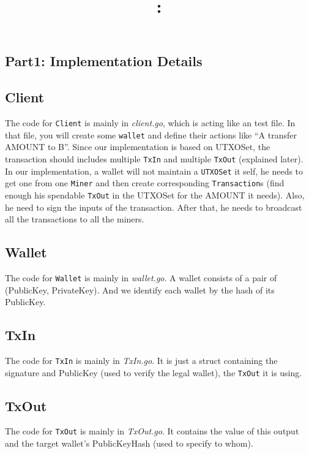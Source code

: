 \documentclass{article}
\title{\textmd{\bf \Class: \Title}\\ \normalsize\vspace{0.1in}}
\date{}
\begin{document}
	\begin{spacing}{1.0}
		\maketitle \thispagestyle{empty}

		\section{Part1: Implementation Details}
		\subsection{Client}
		The code for \texttt{Client} is mainly in \textit{client.go}, which is acting like an test file. In that file, you will create some \texttt{wallet} and define their actions like ``A transfer AMOUNT to B''.
		Since our implementation is based on UTXOSet, the transaction should includes multiple \texttt{TxIn} and multiple \texttt{TxOut} (explained later). In our implementation, a wallet will not maintain a 
		\texttt{UTXOSet} it self, he needs to get one from one \texttt{Miner} and then create corresponding \texttt{Transaction}s (find enough his spendable \texttt{TxOut} in the UTXOSet for the AMOUNT it needs). Also, 
		he need to sign the inputs of the transaction. After that, he needs to broadcast all the transactions to all the miners.

		\subsection{Wallet}
		The code for \texttt{Wallet} is mainly in \textit{wallet.go}. A wallet consists of a pair of (PublicKey, PrivateKey). And we identify each wallet by the hash of its PublicKey.

		\subsection{TxIn}
		The code for \texttt{TxIn} is mainly in \textit{TxIn.go}. It is just a struct containing the signature and PublicKey (used to verify the legal wallet), the \texttt{TxOut} it is using.

		\subsection{TxOut}
		The code for \texttt{TxOut} is mainly in \textit{TxOut.go}. It contains the value of this output and the target wallet's PublicKeyHash (used to specify to whom).


\end{spacing}
\end{document}
